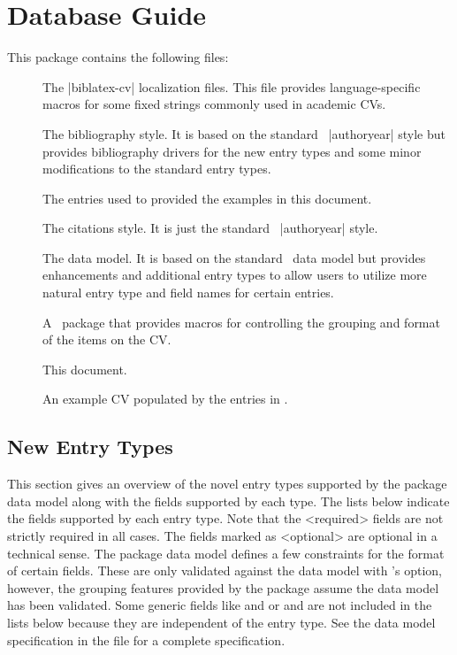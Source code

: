 \documentclass{ltxdockit}[2011/03/25]
\newcommand*{\biber}{\sty{biber}\xspace}
\newcommand*{\biblatex}{\sty{biblatex}\xspace}
\begin{document}
\section{Database Guide}
This package contains the following files:
\begin{description}
	\item[] The |biblatex-cv| localization files. This file provides language-specific macros for some fixed strings commonly used in academic CVs.
	\item[] The  bibliography style. It is based on the standard \biblatex\ |authoryear| style but provides bibliography drivers for the new entry types and some minor modifications to the standard entry types.
	\item[] The  entries used to provided the examples in this document.
	\item[] The  citations style. It is just the standard \biblatex\ |authoryear| style.
	\item[] The  data model. It is based on the standard \biblatex\ data model but provides enhancements and additional entry types to allow users to utilize more natural entry type and field names for certain entries.
	\item[] A \latex\ package that provides macros for controlling the grouping and format of the items on the CV.
	\item[] This document.
	\item[] An example CV populated by the entries in .
\end{description}

\subsection{New Entry Types}
This section gives an overview of the novel entry types supported by the  package data model along with the fields supported by each type. The lists below indicate the fields supported by each entry type. Note that the <required> fields are not strictly required in all cases. The fields marked as <optional> are optional in a technical sense. The  package data model defines a few constraints for the format of certain fields. These are only validated against the data model with \biber's  option, however, the grouping features provided by the  package assume the data model has been validated. Some generic fields like  and  or  and  are not included in the lists below because they are independent of the entry type. See the  data model specification in the file  for a complete specification.
\end{document}
